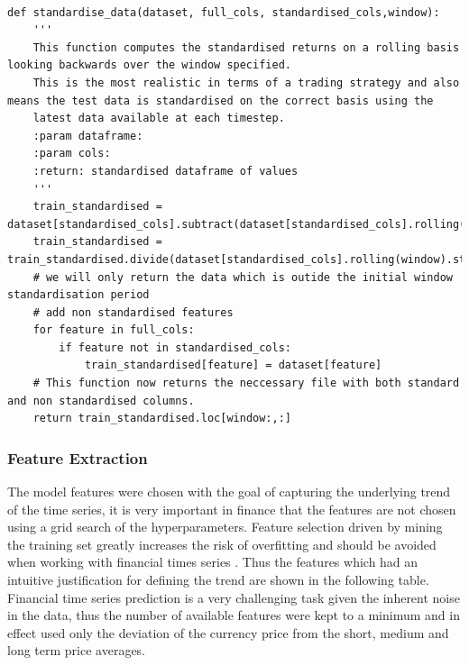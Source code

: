 \documentclass[11pt]{article}
\begin{document}
\begin{lstlisting}

def standardise_data(dataset, full_cols, standardised_cols,window):
    '''
    This function computes the standardised returns on a rolling basis looking backwards over the window specified.
    This is the most realistic in terms of a trading strategy and also means the test data is standardised on the correct basis using the
    latest data available at each timestep.
    :param dataframe:
    :param cols:
    :return: standardised dataframe of values
    '''
    train_standardised = dataset[standardised_cols].subtract(dataset[standardised_cols].rolling(window).mean())
    train_standardised = train_standardised.divide(dataset[standardised_cols].rolling(window).std())
    # we will only return the data which is outide the initial window standardisation period
    # add non standardised features
    for feature in full_cols:
        if feature not in standardised_cols:
            train_standardised[feature] = dataset[feature]
    # This function now returns the neccessary file with both standard and non standardised columns.
    return train_standardised.loc[window:,:]

\end{lstlisting}

 \subsubsection{Feature Extraction}
The model features  were chosen with the goal of capturing the underlying trend of the time series, it is very important in finance that the features are not chosen using a grid search of the hyperparameters. Feature selection driven by mining the training set greatly increases the risk of overfitting and should be avoided when working with financial times series \cite{Arnott2018}. Thus the features which had an intuitive justification for defining the trend are shown in the following table. Financial time series prediction is a very challenging task given the inherent noise in the data, thus the number of available features were kept to a minimum and in effect used only the deviation of the currency price from the short, medium and long term price averages. 
\end{document}
